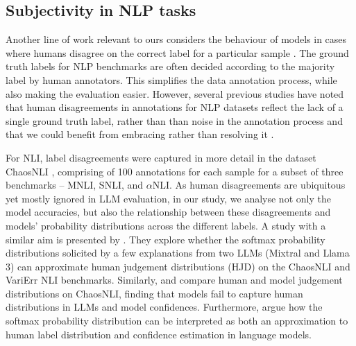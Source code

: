 \subsection{Subjectivity in NLP tasks}
\label{related:subjectivity}
Another line of work relevant to ours considers the behaviour of models in cases where humans disagree on the correct label for a particular sample \citep[for an overview, see][]{plank-2022-problem}.
The ground truth labels for NLP benchmarks are often decided according to the majority label by human annotators. 
This simplifies the data annotation process, while also making the evaluation easier. 
However, several previous studies have noted that human disagreements in annotations for NLP datasets reflect the lack of a single ground truth label, rather than than noise in the annotation process \citep[e.g.][]{de-marneffe-etal-2012-happen, plank-etal-2014-learning,pavlick-kwiatkowski-2019-inherent,nie-etal-2020-learn}and that we could benefit from embracing rather than resolving it \citep{plank-2022-problem,aroyo2015truthIA}.

For NLI, label disagreements were captured in more detail in the dataset ChaosNLI \citep{nie-etal-2020-learn}, comprising of 100 annotations for each sample for a subset of three benchmarks -- MNLI, SNLI, and $\alpha$NLI.
As human disagreements are ubiquitous yet mostly ignored in LLM evaluation, in our study, we analyse not only the model accuracies, but also the relationship between these disagreements and models' probability distributions across the different labels.
A study with a similar aim is presented by \citet{chen2024seeingbig}. They explore whether the softmax probability distributions solicited by a few explanations from two LLMs (Mixtral and Llama 3) can approximate human judgement distributions (HJD) on the ChaosNLI and VariErr NLI \citep{weber-genzel-etal-2024-varierr} benchmarks.
Similarly, \citet{baan-etal-2024-interpreting} and \citet{lee-etal-2023-large} compare human and model judgement distributions on ChaosNLI, finding that models fail to capture human distributions in LLMs and model confidences. 
Furthermore, \citet{baan-etal-2024-interpreting} argue how the softmax probability distribution can be interpreted as both an approximation to human label distribution and confidence estimation in language models.

